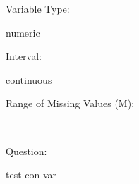 \documentclass[
]{article}
\begin{document}
\begin{minipage}[t]{0.3\linewidth}

Variable Type:

\end{minipage}%
\begin{minipage}[t]{0.7\linewidth}

numeric

\end{minipage}

\begin{minipage}[t]{0.3\linewidth}

Interval:

\end{minipage}%
\begin{minipage}[t]{0.7\linewidth}

continuous

\end{minipage}

\begin{minipage}[t]{0.3\linewidth}

Range of Missing Values (M):

\end{minipage}%
\begin{minipage}[t]{0.7\linewidth}

~

\end{minipage}

\begin{minipage}[t]{0.3\linewidth}

Question:

\end{minipage}%
\begin{minipage}[t]{0.7\linewidth}

test con var

\end{minipage}
\end{document}
